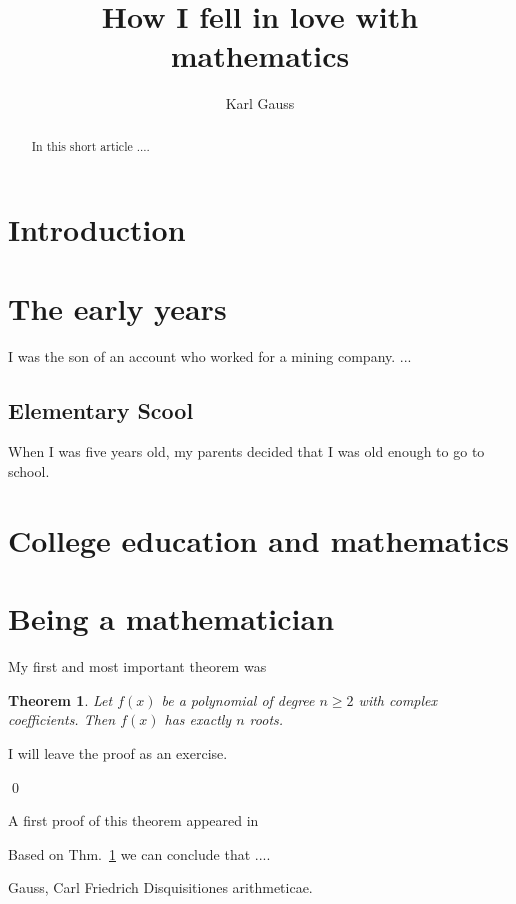 \documentclass[12pt]{amsart}
\title{How I fell in love with mathematics}
\author{Karl Gauss}
\date{} %
\newtheorem{thm}{Theorem}
\begin{document}





\begin{abstract}
In this short article ....
\end{abstract}


\maketitle
\tableofcontents

\section{Introduction}


\section{The early years}

I was the son of an account who worked for a mining company. ...


\subsection{Elementary Scool}

When I was five years old, my parents decided that I was old enough to go to school. 




\section{College education and mathematics}




\section{Being a mathematician}


My first and most important theorem was 

\begin{thm}\label{thm-1}
Let $f(x)$ be a polynomial of degree $n\geq 2$ with complex coefficients.  Then $f(x)$ has exactly $n$ roots. 
\end{thm}

\proof
I will leave the proof as an exercise. 


\qed

A first proof of this theorem appeared in \cite{gauss-1}

Based on Thm.~\ref{thm-1} we can conclude that .... 

\begin{thebibliography}{50}

 
 Gauss, Carl Friedrich
Disquisitiones arithmeticae.

\end{thebibliography}
\end{document}

